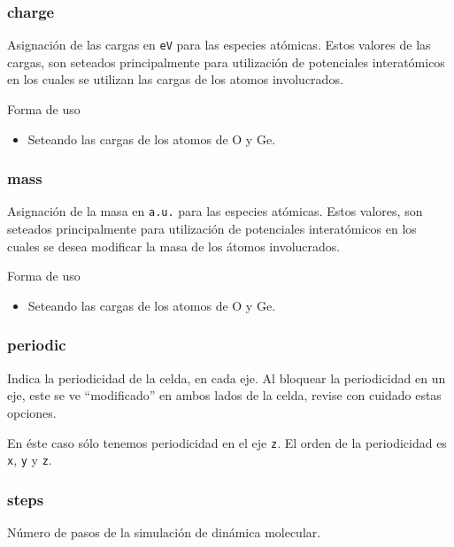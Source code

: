 \subsubsection{charge}
Asignaci\'on de las cargas en \verb|eV| para las especies at\'omicas. Estos valores de las cargas, son seteados principalmente para utilizaci\'on de potenciales interat\'omicos en los cuales se utilizan las cargas de los atomos involucrados.


Forma de uso

\begin{itemize}
 \item Seteando las cargas de los atomos de O y Ge.
\end{itemize}

\subsubsection{mass}
Asignaci\'on de la masa en \verb|a.u.| para las especies at\'omicas. Estos valores, son seteados principalmente para utilizaci\'on de potenciales interat\'omicos en los cuales se desea modificar la masa de los \'atomos involucrados.


Forma de uso

\begin{itemize}
 \item Seteando las cargas de los atomos de O y Ge.
\end{itemize}


\subsubsection{periodic}
Indica la periodicidad de la celda, en cada eje. Al bloquear la periodicidad en un eje, este se ve ``modificado'' en ambos lados de la celda, revise con cuidado estas opciones.


En \'este caso s\'olo tenemos periodicidad en el eje \verb|z|. El orden de la periodicidad es \verb|x|, \verb|y| y \verb|z|.

\subsubsection{steps}
N\'umero de pasos de la simulaci\'on de din\'amica molecular.

